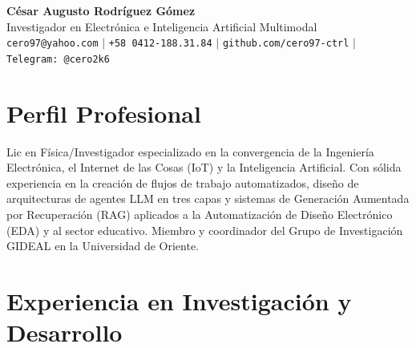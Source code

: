 \documentclass[11pt, a4paper]{article}
\begin{document}
\begin{center}
    {\huge \textbf{César Augusto Rodríguez Gómez}}\\[0.2cm]
    {\large Investigador en Electrónica e Inteligencia Artificial Multimodal}\\[0.2cm]
    \texttt{cero97@yahoo.com} $\vert$ \texttt{+58 0412-188.31.84} $\vert$ \texttt{github.com/cero97-ctrl} $\vert$ \texttt{Telegram: @cero2k6}
\end{center}

\vspace{0.5cm}

\section*{Perfil Profesional}
Lic en Física/Investigador especializado en la convergencia de la Ingeniería Electrónica, el Internet de las Cosas (IoT) y la Inteligencia Artificial. Con sólida experiencia en la creación de flujos de trabajo automatizados, diseño de arquitecturas de agentes LLM en tres capas y sistemas de Generación Aumentada por Recuperación (RAG) aplicados a la Automatización de Diseño Electrónico (EDA) y al sector educativo. Miembro y coordinador del Grupo de Investigación GIDEAL en la Universidad de Oriente.

\section*{Experiencia en Investigación y Desarrollo}
\end{document}
